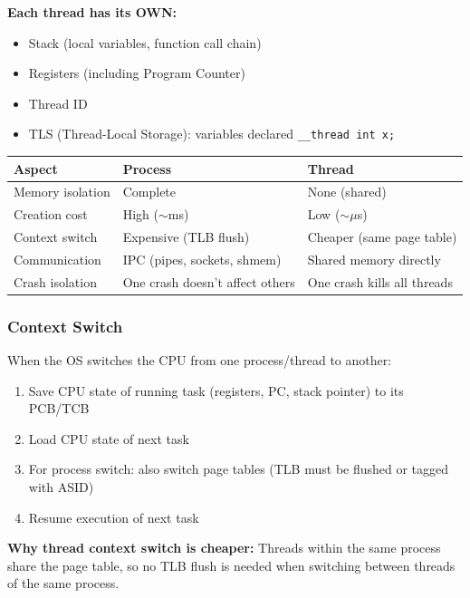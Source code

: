 \documentclass[11pt,a4paper]{article}
\newcommand{\code}[1]{\texttt{\small\colorbox{codebg}{\color{codekw}#1}}}
\begin{document}
\textbf{Each thread has its OWN:}
\begin{itemize}[noitemsep]
  \item Stack (local variables, function call chain)
  \item Registers (including Program Counter)
  \item Thread ID
  \item TLS (Thread-Local Storage): variables declared \code{\_\_thread int x;}
\end{itemize}

\begin{center}
\begin{tabular}{L{5cm} C{3cm} C{3cm}}
\toprule
\textbf{Aspect} & \textbf{Process} & \textbf{Thread} \\
\midrule
Memory isolation & Complete & None (shared) \\
Creation cost & High ($\sim$ms) & Low ($\sim$$\mu$s) \\
Context switch & Expensive (TLB flush) & Cheaper (same page table) \\
Communication & IPC (pipes, sockets, shmem) & Shared memory directly \\
Crash isolation & One crash doesn't affect others & One crash kills all threads \\
\bottomrule
\end{tabular}
\end{center}

\subsubsection{Context Switch}

When the OS switches the CPU from one process/thread to another:
\begin{enumerate}[noitemsep]
  \item Save CPU state of running task (registers, PC, stack pointer) to its PCB/TCB
  \item Load CPU state of next task
  \item For process switch: also switch page tables (TLB must be flushed or tagged with ASID)
  \item Resume execution of next task
\end{enumerate}

\textbf{Why thread context switch is cheaper:} Threads within the same process share the page table, so no TLB flush is needed when switching between threads of the same process.

\end{document}
